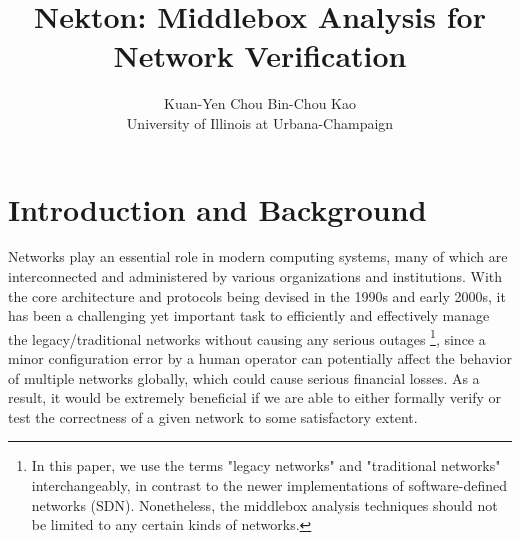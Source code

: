 \usepackage{filecontents}



\date{}

\title{\Large \bf Nekton: Middlebox Analysis for Network Verification}

\author{
{\rm Kuan-Yen Chou}
\qquad
{\rm Bin-Chou Kao}\\
University of Illinois at Urbana-Champaign
} %

\maketitle

\begin{abstract}
\end{abstract}


\section{Introduction and Background}

Networks play an essential role in modern computing systems, many of which are
interconnected and administered by various organizations and institutions. With
the core architecture and protocols being devised in the 1990s and early 2000s,
it has been a challenging yet important task to efficiently and effectively
manage the legacy/traditional networks without causing any serious outages
\footnote{In this paper, we use the terms "legacy networks" and "traditional
networks" interchangeably, in contrast to the newer implementations of
software-defined networks (SDN). Nonetheless, the middlebox analysis techniques
should not be limited to any certain kinds of networks.},
since a minor configuration error by a human operator can potentially affect the
behavior of multiple networks globally, which could cause serious financial
losses. As a result, it would be extremely beneficial if we are able to either
formally verify or test the correctness of a given network to some satisfactory
extent.

